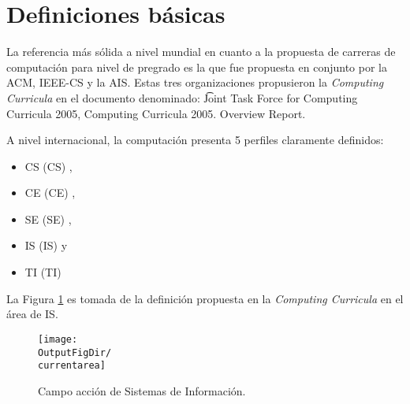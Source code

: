 \section{Definiciones básicas}\label{sec:cs-definiciones-basicas}
La referencia más sólida a nivel mundial en cuanto a la propuesta de carreras de computación 
para nivel de pregrado es la que fue propuesta en conjunto por la \ac{ACM}, 
\ac{IEEE-CS} y la \ac{AIS}. Estas tres organizaciones propusieron la 
{\it Computing Curricula} en el documento denominado: 
{\t Joint Task Force for Computing Curricula 2005, Computing Curricula 2005. Overview Report}\cite{ComputingCurricula2005}.

A nivel internacional, la computación presenta 5 perfiles claramente definidos: 
\begin{itemize}
\item \acl{CS} (\acs{CS}) \cite{ComputerScience2001},
\item \acl{CE} (\acs{CE}) \cite{ComputerEngineering2004},
\item \acl{SE} (\acs{SE}) \cite{SoftwareEngineering2004},
\item \acl{IS} (\acs{IS}) \cite{InformationSystems2002Journal} y 
\item \acl{TI} (\acs{TI}) \cite{InformationTechnology2005}
\end{itemize}


La Figura \ref{fig.is} es tomada de la definición propuesta en la {\it Computing Curricula}
\cite{ComputerScience2001,ComputingCurricula2005} en el área de \ac{IS}. 

\begin{figure}[ht]
   \centering
   \texttt{[image: \\OutputFigDir/\\currentarea]}
   \caption{Campo acción de Sistemas de Información.}
   \label{fig.is}
\end{figure}

